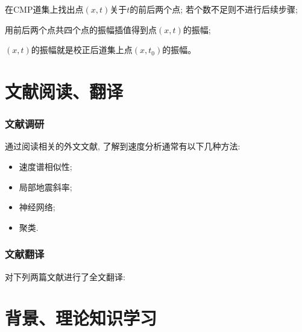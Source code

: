 \documentclass[11pt, professionalfonts]{beamer}
\begin{document}
{\begin{frame}[c]
\begin{algorithm}[H]
{            在CMP道集上找出点$(x,t)$关于$t$的前后两个点; 若个数不足则不进行后续步骤; 

            用前后两个点共四个点的振幅插值得到点$(x,t)$的振幅; 
            
            $(x,t)$的振幅就是校正后道集上点$(x,t_0)$的振幅。
        }
    \end{algorithm}
\end{frame}

\section{文献阅读、翻译}

\begin{frame}[c]
    \frametitle{文献调研}
    \vspace{10pt}
    通过阅读相关的外文文献, 了解到速度分析通常有以下几种方法: 
    
    \vspace{15pt}
    \begin{center}
        \begin{minipage}{.35\textwidth}
            \begin{itemize}
                \item 速度谱相似性; 

                \vspace{8pt}\item 局部地震斜率; 
                
                \vspace{8pt}\item 神经网络; 
                
                \vspace{8pt}\item 聚类. 
            \end{itemize}
        \end{minipage}
    \end{center}
\end{frame}

\begin{frame}[c]
    \frametitle{文献翻译}
    对下列两篇文献进行了全文翻译: 

    \vspace{20pt}

    \vspace{20pt}
\end{frame}

\section{背景、理论知识学习}

}
\end{document}
